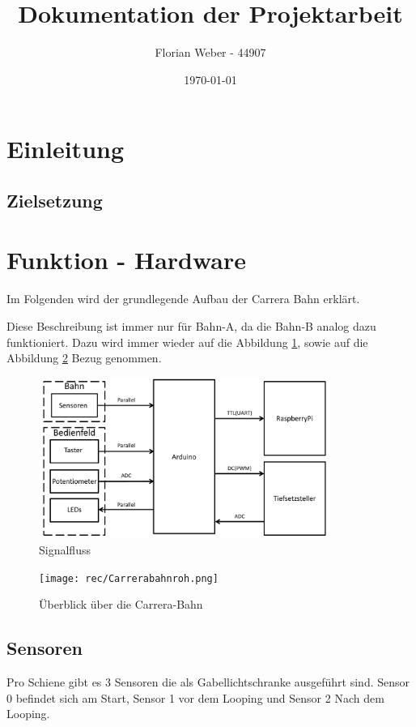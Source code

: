 \documentclass[a4paper, 11pt]{scrartcl}
\title{Dokumentation der Projektarbeit}
\author{Florian Weber - 44907}
\date{\today}
\begin{document}
\maketitle	%
\newpage

\tableofcontents 	%
\listoffigures		%
\newpage

\section{Einleitung}
\subsection{Zielsetzung}
\newpage

\section{Funktion - Hardware}
	Im Folgenden wird der grundlegende Aufbau der Carrera Bahn erklärt.

	Diese Beschreibung ist immer nur für Bahn-A, da die
	Bahn-B analog dazu funktioniert. Dazu wird immer wieder auf die Abbildung \ref{img:signalfluss}, sowie auf die \\Abbildung
	\ref{img:carrerakomplett} Bezug genommen.
	\begin{figure}[h]
		\centering
		\includegraphics[width=0.85\textwidth]{rec/signalfluss.pdf}
		\caption{Signalfluss}
		\label{img:signalfluss}
	\end{figure}
	\begin{figure}[h]
	\centering
	\texttt{[image: rec/Carrerabahnroh.png]}
	\caption{Überblick über die Carrera-Bahn}
	\label{img:carrerakomplett}
	\end{figure}
	\newpage

	\subsection{Sensoren}
		Pro Schiene gibt es 3 Sensoren die als Gabellichtschranke ausgeführt sind. Sensor 0 befindet sich am Start, Sensor 1 vor dem Looping und 		Sensor 2 Nach dem Looping.\\
\end{document}
